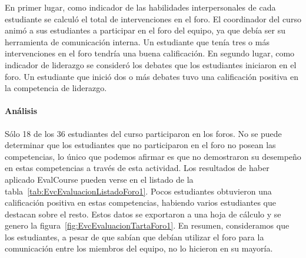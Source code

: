 En primer lugar, como indicador de las habilidades interpersonales de cada estudiante se calculó el total de intervenciones en el foro. El coordinador del curso animó a sus estudiantes a participar en el foro del equipo, ya que debía ser su herramienta de comunicación interna. Un estudiante que tenía tres o más intervenciones en el foro tendría una buena calificación. En segundo lugar, como indicador de liderazgo se consideró los debates que los estudiantes iniciaron en el foro. Un estudiante que inició dos o más debates tuvo una calificación positiva en la competencia de liderazgo.

\paragraph*{Análisis}

Sólo 18 de los 36 estudiantes del curso participaron en los foros. No se puede determinar que los estudiantes que no participaron en el foro no posean las competencias, lo único que podemos afirmar es que no demostraron su desempeño en estas competencias a través de esta actividad. Los resultados de haber aplicado EvalCourse pueden verse en el listado de la tabla~\ref{tab:EvcEvaluacionListadoForo1}. Pocos estudiantes obtuvieron una calificación positiva en estas competencias, habiendo varios estudiantes que destacan sobre el resto. Estos datos se exportaron a una hoja de cálculo y se genero la figura~\ref{fig:EvcEvaluacionTartaForo1}. En resumen, consideramos que los estudiantes, a pesar de que sabían que debían utilizar el foro para la comunicación entre los miembros del equipo, no lo hicieron en su mayoría.

